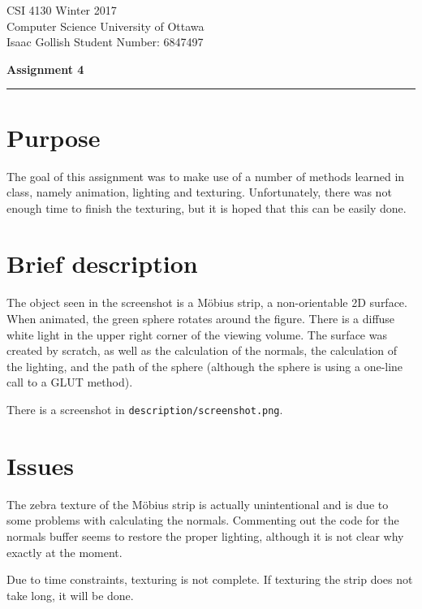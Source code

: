 \documentclass[11pt, letterpaper]{article}
\begin{document}
\noindent
CSI 4130 \hfill Winter 2017 \\
Computer Science \hfill University of Ottawa \\
Isaac Gollish \hfill Student Number: 6847497\\
\begin{center}
    \textbf{Assignment 4} \\
\end{center}

\hrule

\section*{Purpose}
The goal of this assignment was to make use of a number of methods learned in
class, namely animation, lighting and texturing. Unfortunately, there was not
enough time to finish the texturing, but it is hoped that this can be easily
done.


\section*{Brief description}

The object seen in the screenshot is a Möbius strip, a non-orientable 2D
surface. When animated, the green sphere rotates around the figure. There is a
diffuse white light in the upper right corner of the viewing volume. The surface
was created by scratch, as well as the calculation of the normals, the
calculation of the lighting, and the path of the sphere (although the sphere is
using a one-line call to a GLUT method).

There is a screenshot in \texttt{description/screenshot.png}.

\section*{Issues}

The zebra texture of the Möbius strip is actually unintentional and is due to
some problems with calculating the normals. Commenting out the code for the
normals buffer seems to restore the proper lighting, although it is not clear why
exactly at the moment.

Due to time constraints, texturing is not complete. If texturing the strip does
not take long, it will be done.
\end{document}
